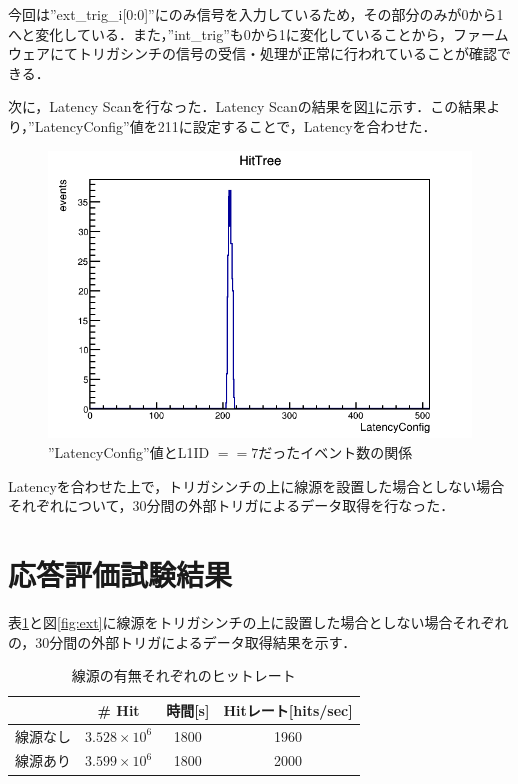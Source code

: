 今回は''ext\_trig\_i[0:0]''にのみ信号を入力しているため，その部分のみが0から1へと変化している．また，''int\_trig''も0から1に変化していることから，ファームウェアにてトリガシンチの信号の受信・処理が正常に行われていることが確認できる．\par
次に，Latency Scanを行なった．Latency Scanの結果を図\ref{fig:exttriglatency}に示す．この結果より，''LatencyConfig''値を211に設定することで，Latencyを合わせた．
\begin{figure}[h]
  \centering
  \includegraphics[width=14cm]{./figure/latencydist.png}
  \caption{''LatencyConfig''値とL1ID $== 7$だったイベント数の関係}
  \label{fig:exttriglatency}
\end{figure}

Latencyを合わせた上で，トリガシンチの上に線源を設置した場合としない場合それぞれについて，30分間の外部トリガによるデータ取得を行なった．

\section{応答評価試験結果}
\label{sec:extconc}
表\ref{tab:ext}と図\ref{fig:ext}に線源をトリガシンチの上に設置した場合としない場合それぞれの，30分間の外部トリガによるデータ取得結果を示す．
\begin{table}[h]
  \centering
  \caption{線源の有無それぞれのヒットレート}
  \begin{tabular} {|l|c|c||c|} \hline
     & \# Hit & 時間[s] & Hitレート[hits/sec] \\  \hline
    線源なし & $3.528 \times 10^6$ & 1800 & 1960 \\ 
    線源あり & $3.599 \times 10^6$ & 1800 & 2000 \\ \hline
  \end{tabular}
  \label{tab:ext}
\end{table}

